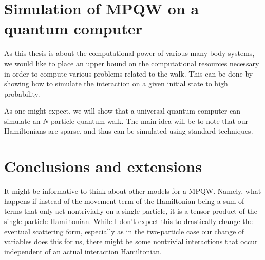 \documentclass[../thesis-main/thesis-main]{subfiles}
\begin{document}
\section{Simulation of MPQW on a quantum computer}

As this thesis is about the computational power of various many-body systems, we would like to place an upper bound on the computational resources necessary in order to compute various problems related to the walk.  This can be done by showing how to simulate the interaction on a given initial state to high probability.

As one might expect, we will show that a universal quantum computer can simulate an $N$-particle quantum walk.  The main idea will be to note that our Hamiltonians are sparse, and thus can be simulated using standard techniques.


\section{Conclusions and extensions}

It might be informative to think about other models for a MPQW.  Namely, what happens if instead of the movement term of the Hamiltonian being a sum of terms that only act nontrivially on a single particle, it is a tensor product of the single-particle Hamiltonian.  While I don't expect this to drastically change the eventual scattering form, especially as in the two-particle case our change of variables does this for us, there might be some nontrivial interactions that occur independent of an actual interaction Hamiltonian.




\biblio{}
\end{document}
